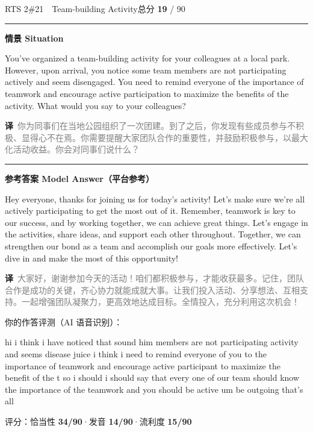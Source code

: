\documentclass[11pt]{article}
\newcommand{\spart}[1]{\textcolor{cPartial}{\bfseries #1}} %
\newcommand{\szero}[1]{\textcolor{cWrong}{\bfseries #1}}   %
\newcommand{\ptesub}[1]{%
  \par\needspace{2\baselineskip}\smallskip
  {\color{cAccent}\rule[-0.2ex]{3pt}{1.05em}}\hspace{6pt}%
  {\bfseries\color{cHead}#1}\par\nopagebreak\smallskip}
\newcommand{\sg}[1]{\textcolor{cSpkGood}{#1}}   %
\newcommand{\sy}[1]{\textcolor{cSpkOk}{#1}}     %
\newcommand{\sr}[1]{\textcolor{cSpkBad}{#1}}    %
\newcommand{\zh}[1]{{\footnotesize\textcolor{cNote}{\textbf{译}}\ \textcolor{gray}{#1}}}
\begin{document}
\begin{qblock}{RTS 2\quad \#21\ \ Team-building Activity}{总分 \textcolor{cAccent}{\bfseries 19} / 90}
\ptesub{情景 Situation}
\begin{promptbox}
You've organized a team-building activity for your colleagues at a local park. However, upon arrival, you notice some team members are not participating actively and seem disengaged. You need to remind everyone of the importance of teamwork and encourage active participation to maximize the benefits of the activity. What would you say to your colleagues?
\end{promptbox}
\zh{你为同事们在当地公园组织了一次团建。到了之后，你发现有些成员参与不积极、显得心不在焉。你需要提醒大家团队合作的重要性，并鼓励积极参与，以最大化活动收益。你会对同事们说什么？}
\ptesub{参考答案 Model Answer（平台参考）}
\begin{modelbox}
Hey everyone, thanks for joining us for today's activity! Let's make sure we're all actively participating to get the most out of it. Remember, teamwork is key to our success, and by working together, we can achieve great things. Let's engage in the activities, share ideas, and support each other throughout. Together, we can strengthen our bond as a team and accomplish our goals more effectively. Let's dive in and make the most of this opportunity!
\end{modelbox}
\zh{大家好，谢谢参加今天的活动！咱们都积极参与，才能收获最多。记住，团队合作是成功的关键，齐心协力就能成就大事。让我们投入活动、分享想法、互相支持。一起增强团队凝聚力，更高效地达成目标。全情投入，充分利用这次机会！}
\smallskip\par{\footnotesize\color{gray}你的作答评测（AI 语音识别）：}
\begin{asrbox}
\sg{hi} \sr{i} \sg{think i have} \sy{noticed} \sg{that sound} \sr{him} \sg{members are not} \sy{participating activity and seems} \sy{disease} \sr{juice} \sg{i think} \sr{i} \sg{need to} \sg{remind everyone} \sy{of you} \sg{to} \sy{the importance of teamwork and} \sy{encourage active participant to} \sr{maximize} \sg{the benefit of} \sy{the t} \sg{so} \sy{i should i should say that every one} \sy{of our team should} \sg{know} \sr{the} \sy{importance} \sg{of} \sy{the} \sy{teamwork and you should be active um} \sg{be outgoing that's all}
\end{asrbox}
{\small 评分：恰当性 \spart{34/90}\quad·\quad 发音 \szero{14/90}\quad·\quad 流利度 \szero{15/90}}
\end{qblock}
\end{document}
